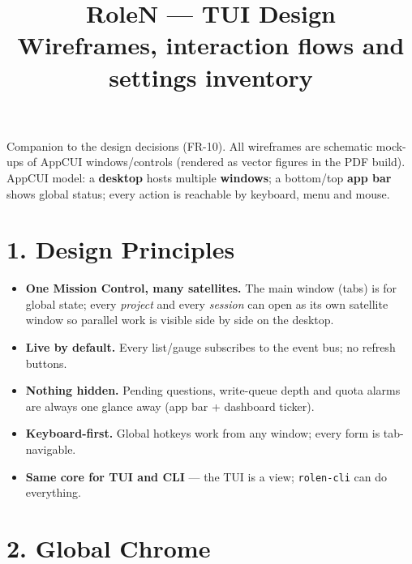 \documentclass[10pt,a4paper]{article}
\title{\textbf{RoleN --- TUI Design}\\[2pt]
\large Wireframes, interaction flows and settings inventory}
\author{}
\date{}
\begin{document}
\maketitle
\thispagestyle{empty}
{\small\tableofcontents}
\clearpage
Companion to the design decisions (FR-10). All wireframes are schematic mock-ups of AppCUI windows/controls (rendered as vector figures in the PDF build). AppCUI model: a \textbf{desktop} hosts multiple \textbf{windows}; a bottom/top \textbf{app bar} shows global status; every action is reachable by keyboard, menu and mouse.

\section{1. Design Principles}
\begin{itemize}
  \item \textbf{One Mission Control, many satellites.} The main window (tabs) is for global state;
every \emph{project} and every \emph{session} can open as its own satellite window so parallel work is visible side by side on the desktop.

  \item \textbf{Live by default.} Every list/gauge subscribes to the event bus; no refresh buttons.
  \item \textbf{Nothing hidden.} Pending questions, write-queue depth and quota alarms are always
one glance away (app bar + dashboard ticker).

  \item \textbf{Keyboard-first.} Global hotkeys work from any window; every form is tab-navigable.
  \item \textbf{Same core for TUI and CLI} — the TUI is a view; \texttt{rolen-cli} can do everything.
\end{itemize}
\section{2. Global Chrome}
\begin{center}

\end{center}
\end{document}
